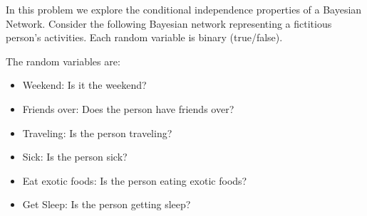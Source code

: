 \documentclass[submit]{harvardml}
\newcommand{\attr}[1]{\textsf{#1}}
\begin{document}
\newpage

\begin{problem}

% 
% 

  
  \noindent In this problem we explore the conditional independence
  properties of a Bayesian Network.  Consider the following Bayesian
  network representing a fictitious person's activities. Each random
  variable is binary (true/false).

\begin{center}
\end{center}

The random variables are:

\begin{itemize}
\item \attr{Weekend}: Is it the weekend?
\item \attr{Friends over}: Does the person have friends over?
\item \attr{Traveling}: Is the person traveling?
\item \attr{Sick}: Is the person sick?
\item \attr{Eat exotic foods}: Is the person eating exotic foods?
\item \attr{Get Sleep}: Is the person getting sleep?
\end{itemize}


\end{problem}
\end{document}
